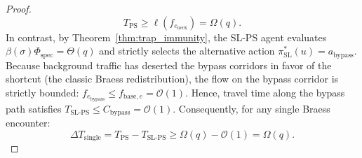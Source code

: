 \documentclass[11pt,a4paper]{article}
\begin{document}
\begin{proof}
\begin{equation}
T_{\text{PS}} \ge \ell(f_{e_{\text{neck}}}) = \Omega(q).
\end{equation}
In contrast, by Theorem~\ref{thm:trap_immunity}, the SL-PS agent evaluates $\beta(\sigma) \Phi_{\text{spec}} = \Theta(q)$ and strictly selects the alternative action $\pi_{\text{SL}}^*(u) = a_{\text{bypass}}$. Because background traffic has deserted the bypass corridors in favor of the shortcut (the classic Braess redistribution), the flow on the bypass corridor is strictly bounded: $f_{e_{\text{bypass}}} \le f_{\text{base}, e} = \mathcal{O}(1)$. Hence, travel time along the bypass path satisfies $T_{\text{SL-PS}} \le C_{\text{bypass}} = \mathcal{O}(1)$. Consequently, for any single Braess encounter:
\begin{equation}
\Delta T_{\text{single}} = T_{\text{PS}} - T_{\text{SL-PS}} \ge \Omega(q) - \mathcal{O}(1) = \Omega(q).
\end{equation}


\end{proof}
\end{document}
